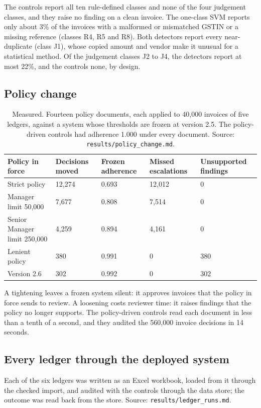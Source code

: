 \documentclass[11pt,a4paper]{article}
\begin{document}
The controls report all ten rule-defined classes and none of the four judgement classes, and they raise no finding on a clean invoice. The one-class SVM reports only about 3\% of the invoices with a malformed or mismatched GSTIN or a missing reference (classes R4, R5 and R8). Both detectors report every near-duplicate (class J1), whose copied amount and vendor make it unusual for a statistical method. Of the judgement classes J2 to J4, the detectors report at most 22\%, and the controls none, by design.

\subsection{Policy change}
\begin{table}[htbp]
\caption{Measured. Fourteen policy documents, each applied to 40,000 invoices of five ledgers, against a system whose thresholds are frozen at version 2.5. The policy-driven controls had adherence 1.000 under every document. Source: \texttt{results/policy\_change.md}.}
\label{tab:policy}
\centering
\small
\begin{tabular}{L{4.2cm}R{2.5cm}R{2.5cm}R{2.5cm}R{2.5cm}}
\toprule
Policy in force & Decisions moved & Frozen adherence & Missed escalations & Unsupported findings \\
\midrule
Strict policy & 12,274 & 0.693 & 12,012 & 0 \\
Manager limit 50,000 & 7,677 & 0.808 & 7,514 & 0 \\
Senior Manager limit 250,000 & 4,259 & 0.894 & 4,161 & 0 \\
Lenient policy & 380 & 0.991 & 0 & 380 \\
Version 2.6 & 302 & 0.992 & 0 & 302 \\
\bottomrule
\end{tabular}
\end{table}

A tightening leaves a frozen system silent: it approves invoices that the policy in force sends to review. A loosening costs reviewer time: it raises findings that the policy no longer supports. The policy-driven controls read each document in less than a tenth of a second, and they audited the 560,000 invoice decisions in 14 seconds.

\subsection{Every ledger through the deployed system}
Each of the six ledgers was written as an Excel workbook, loaded from it through the checked import, and audited with the controls through the data store; the outcome was read back from the store. Source: \texttt{results/\allowbreak ledger\_runs.md}.
\end{document}
